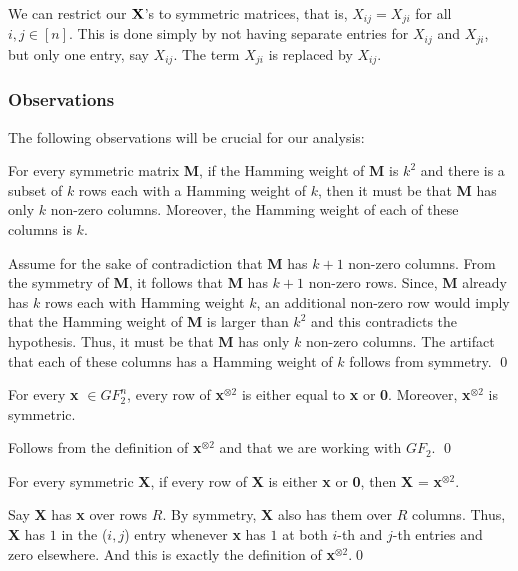 We can restrict our ${\bf X}$'s to symmetric matrices, that is,
${X}_{ij} = {X}_{ji}$ for all $i,j\in [n]$. This is done simply by not
having separate entries for $X_{ij}$ and $X_{ji}$, but only one entry,
say $X_{ij}$. The term $X_{ji}$ is replaced by $X_{ij}$.

\subsubsection{Observations}

The following observations will be crucial for our analysis:

\begin{proposition}\label{symmetric}
For every symmetric matrix {\bf M}, if the Hamming weight of {\bf M} is $k^2$ and
there is a subset of $k$ rows each with a Hamming weight of $k$, then it must be that
{\bf M} has only $k$ non-zero columns. Moreover, the Hamming weight
of each of these columns is $k$.
\end{proposition}
 Assume for the sake of contradiction that {\bf M}
has $k+1$ non-zero columns. From the symmetry of {\bf M}, it follows that
{\bf M} has $k + 1$ non-zero rows. Since, {\bf M} already has $k$ rows each with Hamming weight 
$k$, an additional non-zero row would imply that the Hamming weight of {\bf M} is larger than $k^2$ 
and this contradicts the hypothesis. Thus, it must be that {\bf M} has only $k$ non-zero 
columns. The artifact that each of these columns has a Hamming weight of $k$ follows from symmetry. \qed


\begin{proposition}[Uniqueness]\label{unique}
For every {\bf x} $\in {GF}_2^n$, every row of {\bf x}$^{\otimes 2}$ is 
either equal to {\bf x} or {\bf 0}. Moreover, {\bf x}$^{\otimes 2}$ is symmetric.
\end{proposition}
 Follows from the definition of {\bf
  x}$^{\otimes 2}$ and that we are working with ${GF}_2$. \qed

\begin{proposition}\label{converseUnique}
  For every symmetric {\bf X}, if every row of {\bf X} is either {\bf
    x} or {\bf 0}, then {\bf X} = {\bf x}$^{\otimes 2}$.
\end{proposition}
 Say {\bf X} has {\bf x} over rows $R$. By
symmetry, {\bf X} also has them over $R$ columns. Thus, {\bf X} has
$1$ in the ($i,j$) entry whenever {\bf x} has $1$ at both $i$-th and
$j$-th entries and zero elsewhere. And this is exactly the definition
of {\bf x}$^{\otimes 2}$.\qed\\

